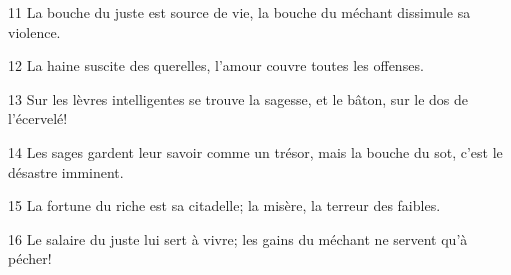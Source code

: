 
11 La bouche du juste est source de vie, la bouche du méchant dissimule sa violence.

12 La haine suscite des querelles, l’amour couvre toutes les offenses.

13 Sur les lèvres intelligentes se trouve la sagesse, et le bâton, sur le dos de l’écervelé!

14 Les sages gardent leur savoir comme un trésor, mais la bouche du sot, c’est le désastre imminent.

15 La fortune du riche est sa citadelle; la misère, la terreur des faibles.

16 Le salaire du juste lui sert à vivre; les gains du méchant ne servent qu’à pécher!